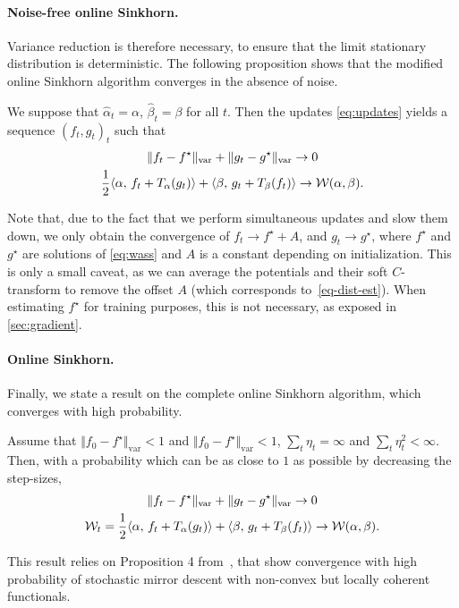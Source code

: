 \paragraph{Noise-free online Sinkhorn.}

Variance reduction is therefore necessary, to ensure that the limit stationary
distribution is deterministic. The following proposition shows that the modified online Sinkhorn algorithm converges in the absence of noise.

\begin{proposition}\label{eq:deterministic}
    We suppose that $\hat \alpha_t = \alpha$, $\hat \beta_t = \beta$ for all
    $t$. Then the updates \eqref{eq:updates} yields a sequence $(f_t, g_t)_t$ such
    that 
    \begin{gather}
        \Vert f_t - f^\star \Vert_{\text{var}} 
        + \Vert g_t - g^\star \Vert_{\text{var}} \to 0 \\
        \frac{1}{2} \langle \alpha,\,f_t + T_{\alpha}(g_t)\rangle + \langle \beta,\,g_t + T_{\beta}(f_t)\rangle 
         \to \mathcal{W}(\alpha, \beta).
    \end{gather}
\end{proposition}
Note that, due to the fact that we perform simultaneous updates and slow them
down, we only obtain the convergence of $f_t \to f^\star + A$, and $g_t \to
g^\star$, where $f^\star$ and $g^\star$ are solutions of \eqref{eq:wass} and $A$
is a constant depending on initialization. This is only a small caveat, as we
can average the potentials and their soft $C$-transform to remove the offset
$A$ (which corresponds to~\eqref{eq-dist-est}). When estimating $f^\star$ for training purposes, this is not necessary, as exposed in \autoref{sec:gradient}.

\paragraph{Online Sinkhorn.}

Finally, we state a result on the complete online Sinkhorn algorithm, which converges with high probability.
 
\begin{proposition}
    Assume that $\Vert f_0 - f^\star \Vert_{\text{var}} < 1$ and $\Vert f_0 -
    f^\star \Vert_{\text{var}} < 1$, $\sum_t \eta_t = \infty$ and $\sum_t
    \eta_t^2 < \infty$. Then, with a probability which can be as close to $1$
    as possible by decreasing the step-sizes,
    \begin{gather}
        \Vert f_t - f^\star \Vert_{\text{var}} + \Vert g_t - 
        g^\star \Vert_{\text{var}} \to 0 \\
        \mathcal{W}_t =\frac{1}{2} \langle \alpha,\,f_t + T_{\alpha}(g_t)\rangle + \langle \beta,\,g_t + T_{\beta}(f_t)\rangle 
        \to \mathcal{W}(\alpha, \beta).
    \end{gather}
\end{proposition}
% 
This result relies on Proposition 4 from~\citet{zhou2017convergence}, that show convergence with
high probability of stochastic mirror descent with non-convex but locally coherent functionals.

